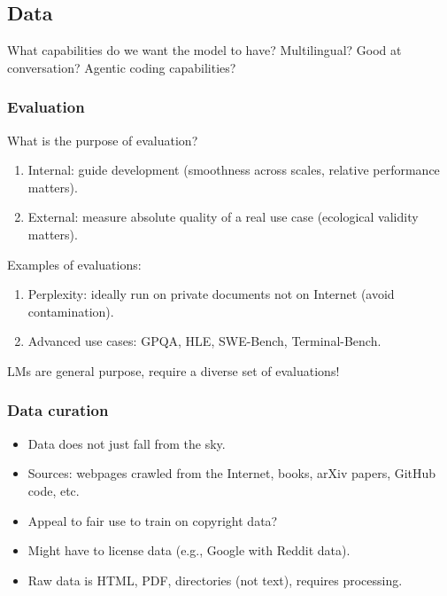 \documentclass[12pt,twoside]{article}
\begin{document}
\subsection*{Data}

What capabilities do we want the model to have? Multilingual? Good at conversation? Agentic coding capabilities?

\subsubsection*{Evaluation}

What is the purpose of evaluation?

\begin{enumerate}
    \item Internal: guide development (smoothness across scales, relative performance matters).
    \item External: measure absolute quality of a real use case (ecological validity matters).
\end{enumerate}

Examples of evaluations:

\begin{enumerate}
    \item Perplexity: ideally run on private documents not on Internet (avoid contamination).
    \item Advanced use cases: GPQA, HLE, SWE-Bench, Terminal-Bench.
\end{enumerate}

LMs are general purpose, require a diverse set of evaluations!

\subsubsection*{Data curation}

\begin{itemize}
    \item Data does not just fall from the sky.
    \item Sources: webpages crawled from the Internet, books, arXiv papers, GitHub code, etc.
    \item Appeal to fair use to train on copyright data?
    \item Might have to license data (e.g., Google with Reddit data).
    \item Raw data is HTML, PDF, directories (not text), requires processing.
\end{itemize}
\end{document}
